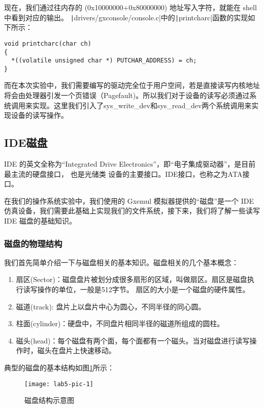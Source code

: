 现在，我们通过往内存的 (0x10000000+0x80000000) 地址写入字符，就能在 shell 中看到对应的输出。
\texttt|drivers/gxconsole/console.c|中的\texttt|printcharc|函数的实现如下所示：

\begin{verbatim}
void printcharc(char ch)
{
  *((volatile unsigned char *) PUTCHAR_ADDRESS) = ch;
}
\end{verbatim}

而在本次实验中，我们需要编写的驱动完全位于用户空间，若是直接读写内核地址将会由处理器引发一个页错误（Pagefault)。所以我们对于设备的读写必须通过系统调用来实现。这里我们引入了sys_write_dev和sys_read_dev两个系统调用来实现设备的读写操作。

\subsection{IDE磁盘}

\begin{note}
IDE 的英文全称为“Integrated Drive Electronics”，即“电子集成驱动器”，是目前最主流的硬盘接口， 也是光储类
设备的主要接口。IDE接口，也称之为ATA接口。
\end{note}

在我们的操作系统实验中，我们使用的 Gxemul 模拟器提供的“磁盘”是一个 IDE 
仿真设备，我们需要此基础上实现我们的文件系统，接下来，我们将了解一些读写 IDE 磁盘的基础知识。

\subsubsection{磁盘的物理结构}

我们首先简单介绍一下与磁盘相关的基本知识。磁盘相关的几个基本概念：

\begin{enumerate}
  \item 扇区(Sector)：磁盘盘片被划分成很多扇形的区域，叫做扇区。扇区是磁盘执行读写操作的单位，一般是512字节。
  扇区的大小是一个磁盘的硬件属性。
  \item 磁道(track): 盘片上以盘片中心为圆心，不同半径的同心圆。
  \item 柱面(cylinder)：硬盘中，不同盘片相同半径的磁道所组成的圆柱。
  \item 磁头(head)：每个磁盘有两个面，每个面都有一个磁头。当对磁盘进行读写操作时，磁头在盘片上快速移动。
\end{enumerate}

典型的磁盘的基本结构如图\ref{lab5-pic-1}所示：

\begin{figure}[htbp]
  \centering
  \texttt{[image: lab5-pic-1]}
  \caption{磁盘结构示意图}\label{lab5-pic-1}
\end{figure}

